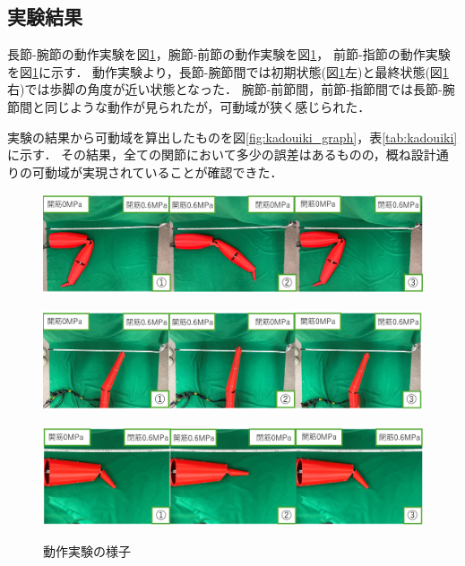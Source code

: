 \subsection{実験結果}
長節-腕節の動作実験を図\ref{fig:dousajikken}，腕節-前節の動作実験を図\ref{fig:dousajikken}，
前節-指節の動作実験を図\ref{fig:dousajikken}に示す．
動作実験より，長節-腕節間では初期状態(図\ref{fig:dousajikken}左)と最終状態(図\ref{fig:dousajikken}右)では歩脚の角度が近い状態となった．
腕節-前節間，前節-指節間では長節-腕節間と同じような動作が見られたが，可動域が狭く感じられた．


実験の結果から可動域を算出したものを図\ref{fig:kadouiki_graph}，表\ref{tab:kadouiki}に示す．
その結果，全ての関節において多少の誤差はあるものの，概ね設計通りの可動域が実現されていることが確認できた．
\begin{figure}[!ht]
    \begin{minipage}[b]{1\hsize}
      \centering
      \includegraphics[scale=0.45]{image/chousetu-wansetu_edited.png}
      \vspace{-1mm}
      \label{fig:move_1}
    \end{minipage}
    \begin{minipage}[b]{1\hsize}
      \centering
      \vspace{3mm}
      \includegraphics[scale=0.45]{image/wansetu-zensetu_edited.png}
      \label{fig:move_2}
    \end{minipage}
    \begin{minipage}[b]{1\hsize}
      \centering
      \vspace{3mm}
      \includegraphics[scale=0.45]{image/zensetu-sisetu_edited.png}
      \label{fig:move_3}
    \end{minipage}
  \caption{動作実験の様子}
  \label{fig:dousajikken}
\end{figure}
